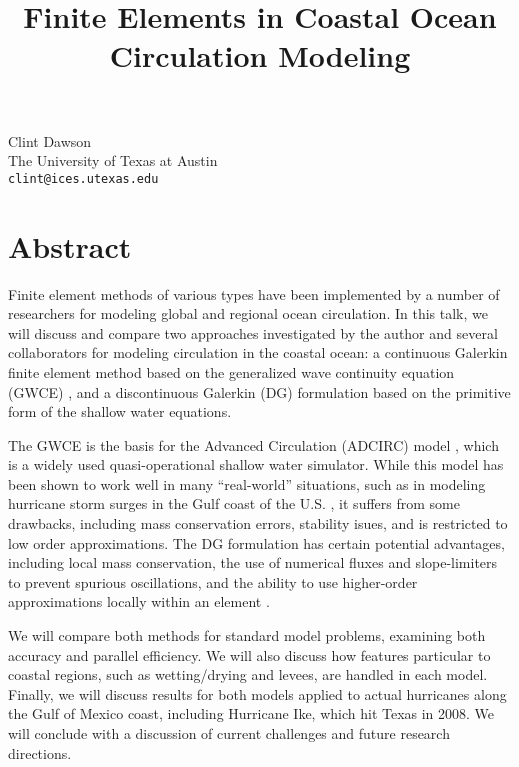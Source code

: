 \title{Finite Elements in Coastal Ocean Circulation Modeling}
\author{} \institute{}
\maketitle

\begin{center}
{\large Clint Dawson}\\
The University of Texas at Austin\\
{\tt clint@ices.utexas.edu}
\end{center}

\section*{Abstract}
Finite element methods of various types have been implemented by a number of researchers for modeling global and regional ocean circulation.  In this talk, we will discuss and compare two approaches investigated by the author and several collaborators for modeling circulation in the coastal ocean: a continuous Galerkin finite element method based on the generalized wave continuity equation (GWCE) \cite{dawson1}, and a discontinuous Galerkin (DG) formulation \cite{dawson2,dawson3} based on the primitive form of the shallow water equations.

The GWCE is the basis for the Advanced Circulation (ADCIRC) model \cite{dawson4}, which is a widely used quasi-operational shallow water simulator.    While this model has been shown to work well in many ``real-world'' situations, such as in modeling hurricane storm surges in the Gulf coast of the U.S. \cite{dawson5,dawson6,dawson7}, it suffers from some drawbacks, including mass conservation errors, stability isues, and is restricted to low order approximations.  The DG formulation has certain potential advantages, including local mass conservation, the use of numerical fluxes and slope-limiters to prevent spurious oscillations, and the ability to use higher-order approximations locally within an element \cite{dawson8}.

We will compare both methods for standard model problems, examining both accuracy and parallel efficiency.  We will also discuss how features particular to coastal regions, such as wetting/drying and levees, are handled in each model. Finally, we will discuss results for both models  applied to actual hurricanes along the Gulf of Mexico coast, including Hurricane Ike, which hit Texas in 2008.  We will conclude with a discussion of current challenges and future research directions.

